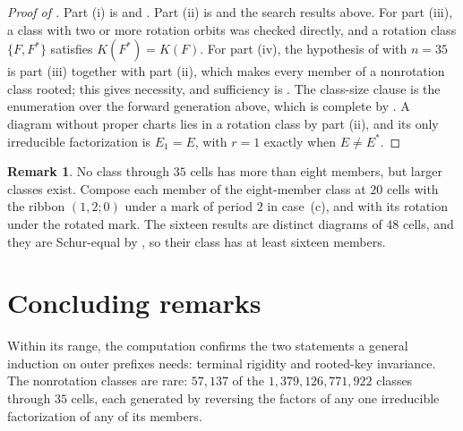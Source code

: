 \documentclass[11pt,a4paper]{amsart}
\numberwithin{equation}{section}
\theoremstyle{plain}
\theoremstyle{definition}
\newtheorem{remark}[theorem]{Remark}
\begin{document}
\begin{proof}[Proof of ]
Part (i) is  and .  Part (ii) is  and the search results above.  For part (iii), a class with two or more rotation orbits was checked directly, and a rotation class \(\{F,F^*\}\) satisfies \(K(F^*)=K(F)\).  For part (iv), the hypothesis of  with \(n=35\) is part (iii) together with part (ii), which makes every member of a nonrotation class rooted; this gives necessity, and sufficiency is \cite[Thm.~5.3.10]{OlsonHarris2024HopfApplications}.  The class-size clause is the enumeration over the forward generation above, which is complete by .  A diagram without proper charts lies in a rotation class by part (ii), and its only irreducible factorization is \(E_1=E\), with \(r=1\) exactly when \(E\ne E^*\).
\end{proof}

\begin{remark}\label{rem:sixteen}
No class through \(35\) cells has more than eight members, but larger classes exist.  Compose each member of the eight-member class at \(20\) cells with the ribbon \((1,2;0)\) under a mark of period \(2\) in case~(c), and with its rotation under the rotated mark.  The sixteen results are distinct diagrams of \(48\) cells, and they are Schur-equal by \cite[Thm.~5.3.10]{OlsonHarris2024HopfApplications}, so their class has at least sixteen members.
\end{remark}

\section{Concluding remarks}\label{sec:remarks}

Within its range, the computation confirms the two statements a general induction on outer prefixes needs: terminal rigidity and rooted-key invariance.  The nonrotation classes are rare: \(57{,}137\) of the \(1{,}379{,}126{,}771{,}922\) classes through \(35\) cells, each generated by reversing the factors of any one irreducible factorization of any of its members.
\end{document}
